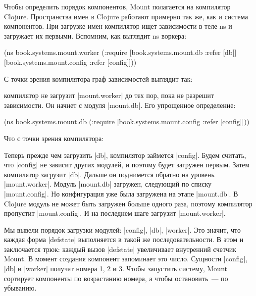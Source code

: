 Чтобы определить порядок компонентов, Mount полагается на компилятор
Clojure. Пространства имен в Clojure работают примерно так же, как и система
компонентов. При загрузке имен компилятор ищет зависимости в теле ns и загружает
их первыми. Вспомним, как выглядит ns воркера:

\begin{code}
(ns book.systems.mount.worker
  (:require
   [book.systems.mount.db :refer [db]]
   [book.systems.mount.config :refer [config]]))
\end{code}

С точки зрения компилятора граф зависимостей выглядит так:


компилятор не загрузит \spverb|mount.worker| до тех пор, пока не разрешит
зависимости. Он начнет с модуля \spverb|mount.db|. Его упрощенное определение:

\begin{code}
(ns book.systems.mount.db
  (:require
   [book.systems.mount.config :refer [config]]))
\end{code}


Что с точки зрения компилятора:


Теперь прежде чем загрузить \spverb|db|, компилятор займется \spverb|config|. Будем считать,
что \spverb|config| не зависит других модулей, и поэтому будет загружен первым. Затем
компилятор загрузит \spverb|db|. Дальше он поднимется обратно на уровень
\spverb|mount.worker|. Модуль \spverb|mount.db| загружен, следующий по списку
\spverb|mount.config|. Но конфигурация уже была загружена на этапе \spverb|mount.db|. В
Clojure модуль не может быть загружен больше одного раза, поэтому компилятор
пропустит \spverb|mount.config|. И на последнем шаге загрузит \spverb|mount.worker|.

Мы вывели порядок загрузки модулей: \spverb|config|, \spverb|db|, \spverb|worker|. Это значит, что
каждая форма \spverb|defstate| выполняется в такой же последовательности. В этом и
заключается трюк: каждый вызов \spverb|defstate| увеличивает внутренний счетчик
Mount. В момент создания компонент запоминает это число. Сущности \spverb|config|, \spverb|db|
и \spverb|worker| получат номера 1, 2 и 3. Чтобы запустить систему, Mount сортирует
компоненты по возрастанию номера, а чтобы остановить~--- по убыванию.


